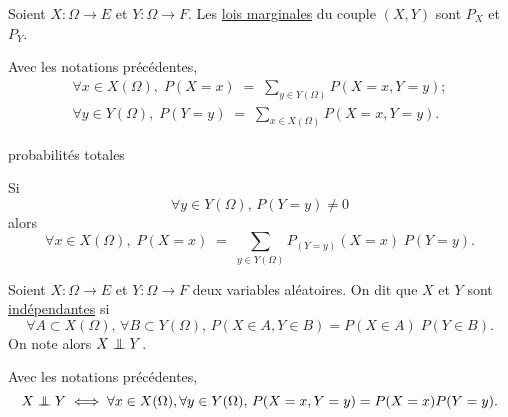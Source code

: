 \begin{defn}
	Soient $X : \Omega \to E$ et $Y : \Omega \to F$. Les \underline{lois marginales} du couple $(X,Y)$ sont $P_X$ et $P_Y$.
\end{defn}

\begin{prop}
	Avec les notations précédentes,
	\begin{gather*}
		\forall x \in X(\Omega),\;P(X = x) \;=\; \sum_{y \in Y(\Omega)} P(X = x,Y=y);\\
		\forall y \in Y(\Omega),\;P(Y = y) \;=\; \sum_{x \in X(\Omega)} P(X = x,Y=y).
	\end{gather*}
\end{prop}

\begin{prv}
	probabilités totales
\end{prv}

\begin{rmk}
	Si \[
		\forall y \in Y(\Omega),\,P(Y=y) \neq 0
	\] alors \[
		\forall x \in X(\Omega),\;P(X = x)\;=\;\sum_{y \in Y(\Omega)}P_{(Y=y)}(X =x)\;P(Y=y)
	.\]
\end{rmk}

\begin{defn}
	Soient $X : \Omega \to E$ et $Y : \Omega \to F$ deux variables aléatoires. On dit que $X$ et $Y$ sont \underline{indépendantes} si \[
		\forall A \subset X(\Omega),\,\forall B \subset Y(\Omega),\,P(X \in A, Y \in B) = P(X \in A)\;P(Y \in B)
	.\] On note alors $X \perp\!\!\!\!\!\:\perp Y$.
\end{defn}

\begin{prop}
	Avec les notations précédentes, \[
		X \perp\!\!\!\!\!\:\perp Y \iff \forall x \in X(\Omega),\forall y \in Y(\Omega),\,P(X=x,Y=y)=P(X=x)P(Y=y)
	.\]
\end{prop}

